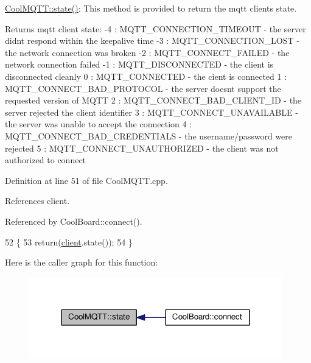 \hyperlink{classCoolMQTT_a5d003307eff78efbd585e42b43b72b6d}{Cool\+M\+Q\+T\+T\+::state()}\+: This method is provided to return the mqtt client\textquotesingle{}s state. \begin{DoxyReturn}{Returns}
mqtt client state\+: -\/4 \+: M\+Q\+T\+T\+\_\+\+C\+O\+N\+N\+E\+C\+T\+I\+O\+N\+\_\+\+T\+I\+M\+E\+O\+UT -\/ the server didn\textquotesingle{}t respond within the keepalive time -\/3 \+: M\+Q\+T\+T\+\_\+\+C\+O\+N\+N\+E\+C\+T\+I\+O\+N\+\_\+\+L\+O\+ST -\/ the network connection was broken -\/2 \+: M\+Q\+T\+T\+\_\+\+C\+O\+N\+N\+E\+C\+T\+\_\+\+F\+A\+I\+L\+ED -\/ the network connection failed -\/1 \+: M\+Q\+T\+T\+\_\+\+D\+I\+S\+C\+O\+N\+N\+E\+C\+T\+ED -\/ the client is disconnected cleanly 0 \+: M\+Q\+T\+T\+\_\+\+C\+O\+N\+N\+E\+C\+T\+ED -\/ the cient is connected 1 \+: M\+Q\+T\+T\+\_\+\+C\+O\+N\+N\+E\+C\+T\+\_\+\+B\+A\+D\+\_\+\+P\+R\+O\+T\+O\+C\+OL -\/ the server doesn\textquotesingle{}t support the requested version of M\+Q\+TT 2 \+: M\+Q\+T\+T\+\_\+\+C\+O\+N\+N\+E\+C\+T\+\_\+\+B\+A\+D\+\_\+\+C\+L\+I\+E\+N\+T\+\_\+\+ID -\/ the server rejected the client identifier 3 \+: M\+Q\+T\+T\+\_\+\+C\+O\+N\+N\+E\+C\+T\+\_\+\+U\+N\+A\+V\+A\+I\+L\+A\+B\+LE -\/ the server was unable to accept the connection 4 \+: M\+Q\+T\+T\+\_\+\+C\+O\+N\+N\+E\+C\+T\+\_\+\+B\+A\+D\+\_\+\+C\+R\+E\+D\+E\+N\+T\+I\+A\+LS -\/ the username/password were rejected 5 \+: M\+Q\+T\+T\+\_\+\+C\+O\+N\+N\+E\+C\+T\+\_\+\+U\+N\+A\+U\+T\+H\+O\+R\+I\+Z\+ED -\/ the client was not authorized to connect 
\end{DoxyReturn}


Definition at line 51 of file Cool\+M\+Q\+T\+T.\+cpp.



References client.



Referenced by Cool\+Board\+::connect().


\begin{DoxyCode}
52 \{
53     \textcolor{keywordflow}{return}(\hyperlink{classCoolMQTT_a4ca71e4f76ef868692a297efd45b1415}{client}.state());
54 \}
\end{DoxyCode}
Here is the caller graph for this function\+:
\nopagebreak
\begin{figure}[H]
\begin{center}
\leavevmode
\includegraphics[width=311pt]{classCoolMQTT_a5d003307eff78efbd585e42b43b72b6d_icgraph}
\end{center}
\end{figure}


